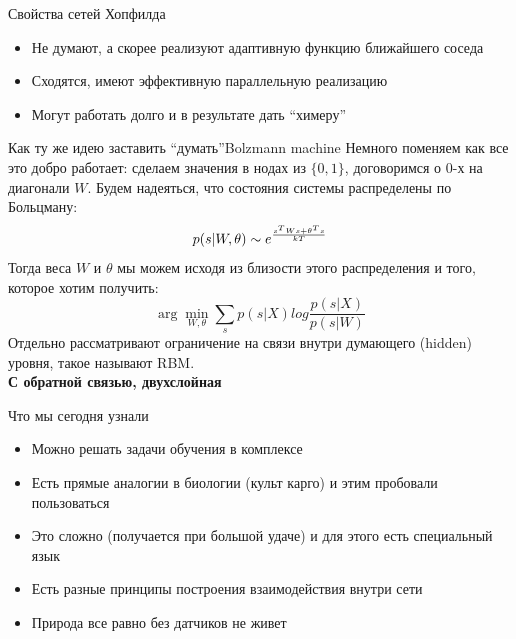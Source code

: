 \documentclass[14pt, fleqn, xcolor={dvipsnames, table}]{beamer}
\begin{document}
\begin{frame}{Свойства сетей Хопфилда}
\begin{itemize}
  \item Не думают, а скорее реализуют адаптивную функцию ближайшего соседа
  \item Сходятся, имеют эффективную параллельную реализацию
  \item Могут работать долго и в результате дать ``химеру''
\end{itemize}
\end{frame}

\begin{frame}{Как ту же идею заставить ``думать''}{Bolzmann machine}
\footnotesize
Немного поменяем как все это добро работает: сделаем значения в нодах из $\{0,1\}$, договоримся о 0-х на диагонали $W$. Будем надеяться, что состояния системы распределены по Больцману:
$$
p(s|W,\theta) \sim e^{s^T W s + \theta^Ts \over kT}
$$
Тогда веса $W$ и $\theta$ мы можем исходя из близости этого распределения и того, которое хотим получить:
$$
\arg\min_{W,\theta} \sum_s p(s|X) log \frac{p(s|X)}{p(s|W)}
$$
Отдельно рассматривают ограничение на связи внутри думающего (hidden) уровня, такое называют RBM.\\
\textbf{С обратной связью, двухслойная}
\end{frame}


\begin{frame}{Что мы сегодня узнали}
\begin{itemize}
  \item Можно решать задачи обучения в комплексе
  \item Есть прямые аналогии в биологии (культ карго) и этим пробовали пользоваться
  \item Это сложно (получается при большой удаче) и для этого есть специальный язык
  \item Есть разные принципы построения взаимодействия внутри сети
  \item Природа все равно без датчиков не живет
\end{itemize}
\end{frame}
\end{document}
